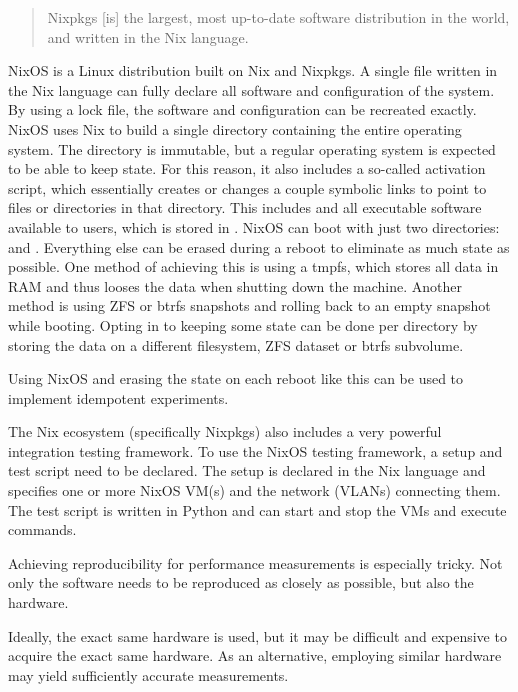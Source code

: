 \blockquote[\cite{nixlang}]{Nixpkgs [is] the largest, most up-to-date software distribution in the world, and written in the Nix language.}

NixOS is a Linux distribution built on Nix and Nixpkgs.
A single file written in the Nix language can fully declare all software and configuration of the system.
By using a lock file, the software and configuration can be recreated exactly.
NixOS uses Nix to build a single directory containing the entire operating system.
The directory is immutable, but a regular operating system is expected to be able to keep state.
For this reason, it also includes a so-called activation script, which essentially creates or changes a couple symbolic links to point to files or directories in that directory.
This includes  and all executable software available to users, which is stored in .
NixOS can boot with just two directories:  and  \cite{Erase_your_darlings}.
Everything else can be erased during a reboot to eliminate as much state as possible.
One method of achieving this is using a tmpfs, which stores all data in RAM and thus looses the data when shutting down the machine.
Another method is using ZFS or btrfs snapshots and rolling back to an empty snapshot while booting.
Opting in to keeping some state can be done per directory by storing the data on a different filesystem, ZFS dataset or btrfs subvolume.

Using NixOS and erasing the state on each reboot like this can be used to implement idempotent experiments.

The Nix ecosystem (specifically Nixpkgs) also includes a very powerful integration testing framework.
To use the NixOS testing framework, a setup and test script need to be declared.
The setup is declared in the Nix language and specifies one or more NixOS VM(s) and the network (VLANs) connecting them.
The test script is written in Python and can start and stop the VMs and execute commands.

Achieving reproducibility for performance measurements is especially tricky.
Not only the software needs to be reproduced as closely as possible, but also the hardware.

Ideally, the exact same hardware is used, but it may be difficult and expensive to acquire the exact same hardware.
As an alternative, employing similar hardware may yield sufficiently accurate measurements.


